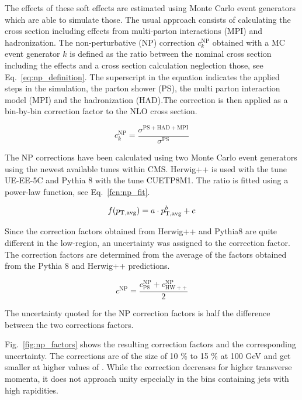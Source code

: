 The effects of these soft effects are estimated using Monte Carlo event
generators which are able to simulate those. The usual approach consists of
calculating the cross section including effects from multi-parton interactions
(MPI) and hadronization. The non-perturbative (NP) correction $c_k^\mathrm{NP}$
obtained with a MC event generator $k$ is defined as the ratio between the
nominal cross section including the effects and a cross section calculation
neglection those, see Eq.~\ref{eq:np_definition}. The superscript in the
equation indicates the applied steps in the simulation, the parton shower (PS),
the multi parton interaction model (MPI) and the hadronization (HAD).The
correction is then applied as a bin-by-bin correction factor to the NLO cross
section.

\begin{equation}
    c_{k}^{\mathrm{NP}} = \frac{\sigma^{\mathrm{PS+HAD+MPI}}}{\sigma^{\mathrm{PS}}}
    \label{eq:np_definition}
\end{equation}

The NP corrections have been calculated using two Monte Carlo
event generators using the newest available tunes within CMS. Herwig++ is used
with the tune UE-EE-5C and Pythia 8 with the tune CUETP8M1. The ratio is fitted
using a power-law function, see Eq.~\ref{fcn:np_fit}.

\begin{equation}
  f(p_{\mathrm{T,avg}}) = a \cdot p_{\mathrm{T,avg}}^b + c
  \label{fcn:np_fit}
\end{equation}

Since the correction factors obtained from Herwig++ and Pythia8 are quite
different in the low-\pt region, an uncertainty was assigned to the correction
factor. The correction factors are determined from the average of the factors
obtained from the Pythia 8 and Herwig++ predictions.

\begin{equation*}
    c^\mathrm{NP} = \frac{c_{\mathrm{P8}}^{\mathrm{NP}} + c_{\mathrm{HW++}}^{\mathrm{NP}}}{2}
\end{equation*}

The uncertainty quoted for the NP correction factors is half the difference
between the two corrections factors.

Fig.~\ref{fig:np_factors} shows the resulting correction factors and the
corresponding uncertainty.  The corrections are of the size of 10 \% to 15 \% at
100 \si{GeV} and get smaller at higher values of \ptavg. While the correction
decreases for higher transverse momenta, it does not approach unity especially
in the bins containing jets with high rapidities. 

